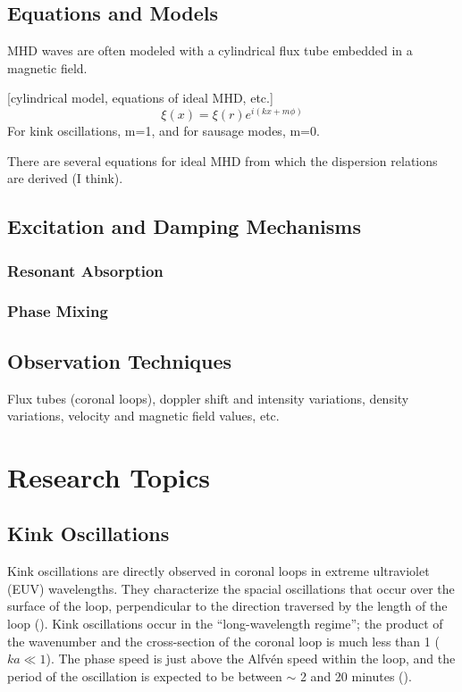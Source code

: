 \documentclass[preprint2]{aastex}
\begin{document}
\subsection{Equations and Models}
MHD waves are often modeled with a cylindrical flux tube embedded
in a magnetic field.

[cylindrical model, equations of ideal MHD, etc.]
$$ \xi(x) = \xi(r)e^{i(kx+m\phi)} $$
For kink oscillations, m=1, and for sausage modes, m=0.

There are several equations for ideal MHD from which the dispersion
relations are derived (I think).
\subsection{Excitation and Damping Mechanisms}
\subsubsection{Resonant Absorption}
\subsubsection{Phase Mixing}
\subsection{Observation Techniques}
Flux tubes (coronal loops), doppler shift and intensity variations,
density variations, velocity and magnetic field values,
etc.
\section{Research Topics}\label{topics}
\subsection{Kink Oscillations}
Kink oscillations are directly observed in coronal loops in extreme
ultraviolet (EUV) wavelengths.
They characterize the spacial oscillations that occur over the surface of
the loop, perpendicular to the direction traversed by the length
of the loop (\cite{Nak}).
Kink oscillations occur in the ``long-wavelength regime'';
the product of the wavenumber and the cross-section of the coronal
loop is much less than 1 ($ka \ll 1$). The phase speed is just above
the Alfv\'en speed within the loop, and the period of the oscillation
is expected to be between $\sim$ 2 and 20 minutes
(\cite{Asc}).
\end{document}
